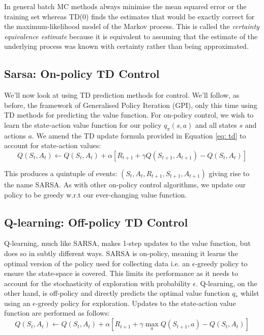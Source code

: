 In general batch MC methods always minimise the mean squared error or the training set whereas TD(0) finds the estimates that would be exactly correct for the maximum-likelihood model of the Markov process. This is called the \textit{certainty equivalence estimate} because it is equivalent to assuming that the estimate of the underlying process was known with certainty rather than being approximated.

\subsection{Sarsa: On-policy TD Control}
We'll now look at using TD prediction methods for control. We'll follow, as before, the framework of Generalised Policy Iteration (GPI), only this time using TD methods for predicting the value function.
For on-policy control, we wish to learn the state-action value function for our policy $q_\pi(s,a)$ and all states $s$ and actions $a$. We amend the TD update formula provided in Equation \ref{eq: td} to account for state-action values:
\begin{equation}
Q(S_t, A_t) \leftarrow Q(S_t, A_t) + \alpha \left[R_{t+1} + \gamma Q(S_{t+1}, A_{t+1}) - Q(S_t, A_t) \right]
\end{equation}

This produces a quintuple of events: $(S_t, A_t, R_{t+1}, S_{t+1}, A_{t+1})$ giving rise to the name SARSA. As with other on-policy control algorithms, we update our policy to be greedy w.r.t our ever-changing value function.

\subsection{Q-learning: Off-policy TD Control}
Q-learning, much like SARSA, makes 1-step updates to the value function, but does so in subtly different ways. SARSA is on-policy, meaning it learns the optimal version of the policy used for collecting data i.e. an $\epsilon$-greedy policy to ensure the state-space is covered. This limits its performance as it needs to account for the stochasticity of exploration with probability $\epsilon$. Q-learning, on the other hand, is off-policy and directly predicts the optimal value function $q_*$ whilst using an $\epsilon$-greedy policy for exploration. Updates to the state-action value function are performed as follows:
\begin{equation}
Q(S_t, A_t) \leftarrow Q(S_t, A_t) + \alpha \left[R_{t+1} + \gamma \max_{a} Q(S_{t+1}, a) - Q(S_t, A_t) \right]
\end{equation}

